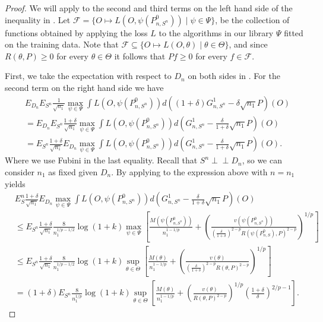 \documentclass[11pt, a4paper]{article}
\theoremstyle{definition}
\theoremstyle{remark}
\newcommand{\indep}{\perp \!\!\! \perp}
\newcommand{\btheta}{\theta}
\newcommand{\la}{\psi}
\newcommand{\Sn}{S^n}
\newcommand{\lib}{\Psi}
\begin{document}
\begin{proof}[Proof]
    We will apply  to the second and third terms on the left hand side of the inequality in . Let $ \mathcal{F} = \{O \mapsto L(O, \la(P_{n,\Sn}^{0})) \mid \la \in \lib\}$, be the collection of functions obtained by applying the loss $ L $ to the algorithms in our library $ \lib$ fitted on the training data. Note that $ \mathcal{F} \subseteq \{O \mapsto L(O, \btheta) \mid \btheta \in \Theta\} $, and since $ R(\btheta, P) \geq 0 $ for every $ \btheta \in \Theta $ it follows that $ Pf \geq 0 $ for every $ f \in \mathcal{F} $.

First, we take the expectation with respect to $ D_n $ on both sides in . For the second term on the right hand side we have 
\begin{align*}
&E_{D_n} E_{\Sn} \frac{1}{\sqrt{n_1} } \max_{\la \in \lib} \int L(O, \la(P_{n, \Sn}^{0})) d ((1 + \delta) G_{n,\Sn}^{1} - \delta \sqrt{n_1} P)(O)\\
&= 
E_{D_n}E_{\Sn} \frac{1 + \delta}{\sqrt{n_1} } \max_{\la \in \lib} \int L(O, \la(P_{n, \Sn}^{0})) d (G_{n,\Sn}^{1} - \frac{\delta }{1 + \delta} \sqrt{n_1} P)(O)\\
&=E_{\Sn} \frac{1 + \delta}{\sqrt{n_1} } E_{D_n}\max_{\la \in \lib} \int L(O, \la(P_{n, \Sn}^{0})) d (G_{n,\Sn}^{1} - \frac{\delta }{1 + \delta} \sqrt{n_1} P)(O).
\end{align*}
Where we use Fubini in the last equality. Recall that $ \Sn \indep D_n $, so we can consider $ n_1 $ as fixed given $ D_n $. By applying  to the expression above with $ n = n_1 $ yields 
\begin{align*}
&E_\Sn\frac{1 + \delta}{\sqrt{n_1} } E_{D_n} \max_{\la \in \lib} \int L(O, \la(P_{n, \Sn}^{0})) d (G_{n,\Sn}^{1} - \frac{\delta }{1 + \delta} \sqrt{n_1} P)(O) \\
&\leq E_{\Sn} \frac{1 + \delta}{\sqrt{n_1}} \frac{8}{n_1^{1/p-1/2}} \log(1 + k) \max_{\la \in \lib} \left[ \frac{M(\la(P_{n,\Sn}^{0}))}{n_1^{1-1/p}} + \left( \frac{v(\la(P_{n,\Sn}^0) )}{( \frac{\delta}{1 + \delta} )^{2-p} R(\la(P_{n,S}^{0}), P)^{2-p}} \right)^{1/p} \right] \\
&\leq E_{\Sn}\frac{1 + \delta}{\sqrt{n_1}} \frac{8}{n_1^{1/p-1/2}} \log(1 + k) \sup_{\btheta \in \Theta} \left[ \frac{M(\btheta)}{n_1^{1-1/p}} + \left( \frac{v(\btheta)}{( \frac{\delta}{1 + \delta} )^{2-p} R(\btheta,P)^{2-p}} \right)^{1/p} \right] \\
&= (1 + \delta) E_{\Sn}\frac{8}{n_1^{1/p}} \log(1 + k) \sup_{\btheta \in \Theta} \left[ \frac{M(\btheta)}{n_1^{1-1/p}} + \left( \frac{v(\btheta)}{R(\btheta,P)^{2-p}} \right)^{1/p}\left( \frac{1 + \delta}{\delta}  \right)^{2/p-1} \right].  

\end{align*}
\end{proof}
\end{document}
